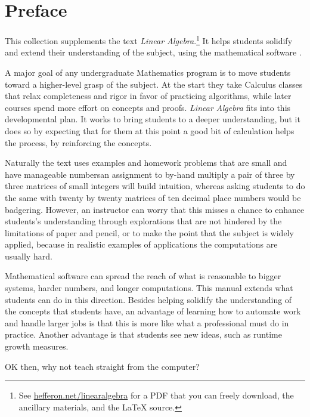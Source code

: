 \chapter*{Preface}\pagestyle{preface}\thispagestyle{preface}
\setlength{\parskip}{.25ex}


This collection supplements the text \nocite{Hefferon12}
\textit{Linear Algebra}.\footnote{See 
\protect\url{hefferon.net/linearalgebra}
for a PDF that you can freely download, the ancillary materials, and
the \protect\LaTeX{} source.}
It helps students
solidify and extend their understanding of the subject, 
using the mathematical software \Sage{}.%

A major goal of any undergraduate Mathematics program is to move students 
toward a higher-level grasp of the subject.
At the start they take Calculus classes that relax
completeness and rigor in favor of practicing algorithms, while
later courses spend more effort on concepts and proofs.
\textit{Linear Algebra} fits into this developmental plan.
It works to bring students to a deeper understanding, 
but it does so by expecting
that for them at this point a good bit of calculation helps the process,
by reinforcing the concepts. 

Naturally the text uses examples and homework problems
that are small and have manageable numbers\Dash an 
assignment to by-hand multiply a pair of three by three matrices
of small integers will build intuition, whereas asking students to do the same
with twenty by twenty matrices
of ten decimal place numbers would be badgering.
However, an instructor can worry that this misses a chance
to enhance students's understanding through explorations that are not 
hindered by the limitations of paper and pencil,
or to make the point that the subject is widely applied, because in 
realistic examples of 
applications the computations are usually hard. 

Mathematical software can spread the reach of
what is reasonable 
to bigger systems, harder numbers, and longer computations.
This manual extends what students can do in this direction.
Besides helping solidify the understanding of the concepts that students have,
an advantage of learning how to automate work and
handle larger jobs is that 
this is more like what a professional must do in practice.
Another advantage is that students see new ideas, such as 
runtime growth measures.

OK then, why 
not teach straight from the computer?

